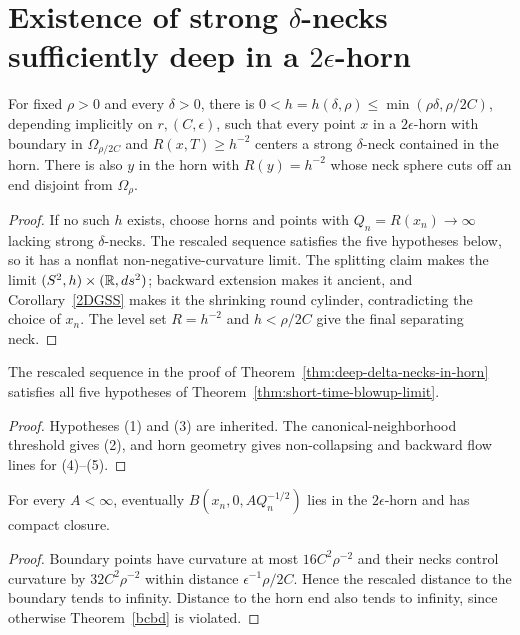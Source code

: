 \section{Existence of strong $\delta$-necks sufficiently deep in a $2\epsilon$-horn}
\begin{theorem}
\label{thm:deep-delta-necks-in-horn}\label{hexist}

For fixed $\rho>0$ and every $\delta>0$, there is
$0<h=h(\delta,\rho)\le\min(\rho\delta,\rho/2C)$, depending implicitly on
$r,(C,\epsilon)$, such that every point $x$ in a $2\epsilon$-horn with
boundary in $\Omega_{\rho/2C}$ and $R(x,T)\ge h^{-2}$ centers a strong
$\delta$-neck contained in the horn. There is also $y$ in the horn with
$R(y)=h^{-2}$ whose neck sphere cuts off an end disjoint from $\Omega_\rho$.
\end{theorem}
\begin{proof}
\sketch If no such $h$ exists, choose horns and points with
$Q_n=R(x_n)\to\infty$ lacking strong $\delta$-necks. The rescaled sequence
satisfies the five hypotheses below, so it has a nonflat non-negative-curvature
limit. The splitting claim makes the limit $(S^2,h)\times(\mathbb{R},ds^2)$;
backward extension makes it ancient, and Corollary~\ref{2DGSS} makes it the
shrinking round cylinder, contradicting the choice of $x_n$. The level set
$R=h^{-2}$ and $h<\rho/2C$ give the final separating neck.\end{proof}

\begin{claim}
\label{claim:rescaled-sequence-satisfies-hypotheses}\label{hyp}

The rescaled sequence in the proof of Theorem~\ref{thm:deep-delta-necks-in-horn}
satisfies all five hypotheses of Theorem~\ref{thm:short-time-blowup-limit}.
\end{claim}
\begin{proof}\sketch Hypotheses (1) and
(3) are inherited. The canonical-neighborhood threshold gives (2), and horn
geometry gives non-collapsing and backward flow lines for (4)--(5).\end{proof}

\begin{claim}
\label{claim:ball-contained-in-horn-compact-closure}
For every $A<\infty$, eventually
$B(x_n,0,AQ_n^{-1/2})$ lies in the $2\epsilon$-horn and has compact closure.
\end{claim}
\begin{proof}\sketch Boundary points have curvature at most
$16C^2\rho^{-2}$ and their necks control curvature by $32C^2\rho^{-2}$ within
distance $\epsilon^{-1}\rho/2C$. Hence the rescaled distance to the boundary
tends to infinity. Distance to the horn end also tends to infinity, since
otherwise Theorem~\ref{bcbd} is violated.\end{proof}

